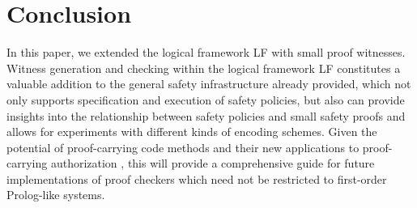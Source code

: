 \documentclass{llncs}
\begin{document}
\section{Conclusion}
In this paper, we extended the logical framework LF with small proof
witnesses. Witness generation and checking within the logical
framework LF constitutes a valuable addition to the general safety
infrastructure already provided, which not only supports specification
and execution of safety policies, but also can provide insights into
the relationship between safety policies and small safety proofs and
allows for experiments with different kinds of encoding schemes.
Given the potential of proof-carrying code methods and their new
applications to proof-carrying authorization
\cite{AppelFelten99,bauer:thesis}, this will provide a comprehensive
guide for future implementations of proof checkers which need not be
restricted to first-order Prolog-like systems.





\end{document}
